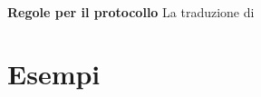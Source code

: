 \documentclass[12pt]{report}
\begin{document}
\\
\textbf{Regole per il protocollo } La traduzione di $ $
\section*{Esempi}
\end{document}
